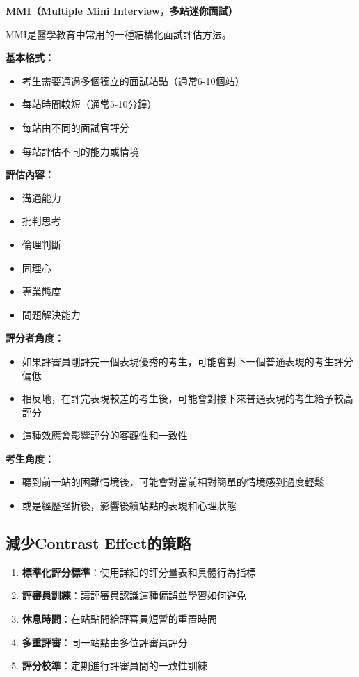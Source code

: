 \documentclass[12pt,a4paper]{article}
\begin{document}
\begin{importantbox}
\textbf{MMI（Multiple Mini Interview，多站迷你面試）}

MMI是醫學教育中常用的一種結構化面試評估方法。

\textbf{基本格式：}
\begin{itemize}[nosep]
    \item 考生需要通過多個獨立的面試站點（通常6-10個站）
    \item 每站時間較短（通常5-10分鐘）
    \item 每站由不同的面試官評分
    \item 每站評估不同的能力或情境
\end{itemize}

\textbf{評估內容：}
\begin{itemize}[nosep]
    \item 溝通能力
    \item 批判思考
    \item 倫理判斷
    \item 同理心
    \item 專業態度
    \item 問題解決能力
\end{itemize}
\end{importantbox}

\textbf{評分者角度：}
\begin{itemize}[nosep]
    \item 如果評審員剛評完一個表現優秀的考生，可能會對下一個普通表現的考生評分偏低
    \item 相反地，在評完表現較差的考生後，可能會對接下來普通表現的考生給予較高評分
    \item 這種效應會影響評分的客觀性和一致性
\end{itemize}

\textbf{考生角度：}
\begin{itemize}[nosep]
    \item 聽到前一站的困難情境後，可能會對當前相對簡單的情境感到過度輕鬆
    \item 或是經歷挫折後，影響後續站點的表現和心理狀態
\end{itemize}

\subsection{減少Contrast Effect的策略}

\begin{enumerate}
    \item \textbf{標準化評分標準}：使用詳細的評分量表和具體行為指標
    \item \textbf{評審員訓練}：讓評審員認識這種偏誤並學習如何避免
    \item \textbf{休息時間}：在站點間給評審員短暫的重置時間
    \item \textbf{多重評審}：同一站點由多位評審員評分
    \item \textbf{評分校準}：定期進行評審員間的一致性訓練
\end{enumerate}
\end{document}
